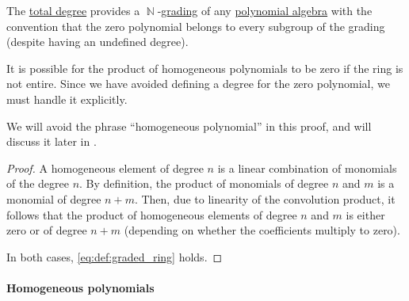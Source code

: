 \begin{proposition}\label{thm:polynomial_algebra_grading}
  The \hyperref[def:polynomial_degree]{total degree} provides a \( \BbbN \)-\hyperref[def:algebra_grading]{grading} of any \hyperref[def:polynomial_algebra]{polynomial algebra} with the convention that the zero polynomial belongs to every subgroup of the grading (despite having an undefined degree).
\end{proposition}
\begin{comments}
  \item It is possible for the product of homogeneous polynomials to be zero if the ring is not entire. Since we have avoided defining a degree for the zero polynomial, we must handle it explicitly.

  \item We will avoid the phrase \enquote{homogeneous polynomial} in this proof, and will discuss it later in .
\end{comments}
\begin{proof}
  A homogeneous element of degree \( n \) is a linear combination of monomials of the degree \( n \). By definition, the product of monomials of degree \( n \) and \( m \) is a monomial of degree \( n + m \). Then, due to linearity of the convolution product, it follows that the product of homogeneous elements of degree \( n \) and \( m \) is either zero or of degree \( n + m \) (depending on whether the coefficients multiply to zero).

  In both cases, \eqref{eq:def:graded_ring} holds.
\end{proof}

\paragraph{Homogeneous polynomials}

